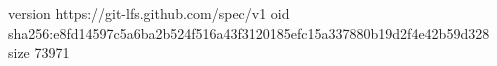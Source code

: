 version https://git-lfs.github.com/spec/v1
oid sha256:e8fd14597c5a6ba2b524f516a43f3120185efc15a337880b19d2f4e42b59d328
size 73971

